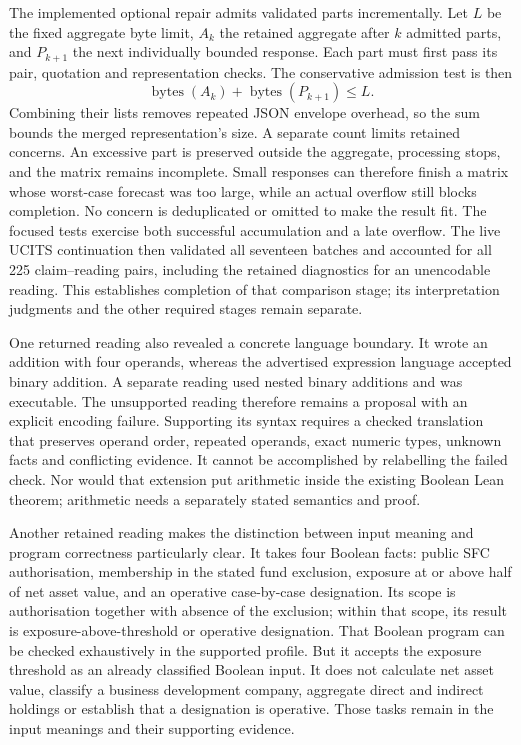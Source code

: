 \documentclass[12pt,a4paper,oneside,openany]{book}
\begin{document}
The implemented optional repair admits validated parts incrementally. Let $L$ be the fixed
aggregate byte limit, $A_k$ the retained aggregate after $k$ admitted parts, and
$P_{k+1}$ the next individually bounded response. Each part must first pass its
pair, quotation and representation checks. The conservative admission test is
then
\[
  \operatorname{bytes}(A_k)+\operatorname{bytes}(P_{k+1})\leq L.
\]
Combining their lists removes repeated JSON envelope overhead, so the sum bounds
the merged representation's size. A separate count limits retained concerns.
An excessive part is preserved outside the aggregate, processing stops, and the
matrix remains incomplete. Small responses can therefore finish a matrix whose
worst-case forecast was too large, while an actual overflow still blocks
completion. No concern is deduplicated or omitted to make the result fit.
The focused tests exercise both successful accumulation and a late overflow.
The live UCITS continuation then validated all seventeen batches and accounted
for all 225 claim--reading pairs, including the retained diagnostics for an
unencodable reading. This establishes completion of that comparison stage;
its interpretation judgments and the other required stages remain separate.

One returned reading also revealed a concrete language boundary. It wrote an
addition with four operands, whereas the advertised expression language
accepted binary addition. A separate reading used nested binary additions and
was executable. The unsupported reading therefore remains a proposal with an
explicit encoding failure. Supporting its syntax requires a checked translation
that preserves operand order, repeated operands, exact numeric types, unknown
facts and conflicting evidence. It cannot be accomplished by relabelling the
failed check. Nor would that extension put arithmetic inside the existing
Boolean Lean theorem; arithmetic needs a separately stated semantics and proof.

Another retained reading makes the distinction between input meaning and
program correctness particularly clear. It takes four Boolean facts: public
SFC authorisation, membership in the stated fund exclusion, exposure at or above
half of net asset value, and an operative case-by-case designation. Its scope is
authorisation together with absence of the exclusion; within that scope, its
result is exposure-above-threshold or operative designation. That Boolean
program can be checked exhaustively in the supported profile. But it accepts
the exposure threshold as an already classified Boolean input. It does not
calculate net asset value, classify a business development company, aggregate
direct and indirect holdings or establish that a designation is operative.
Those tasks remain in the input meanings and their supporting evidence.
\end{document}
